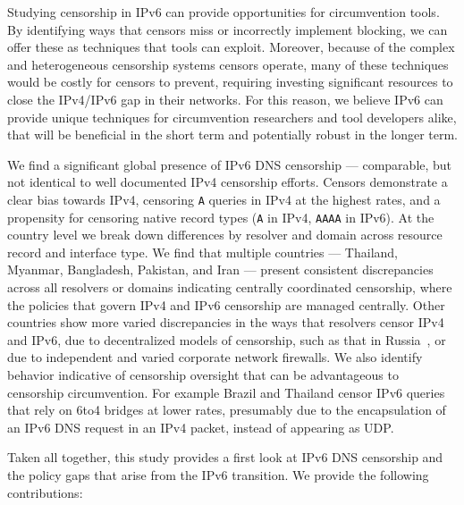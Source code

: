 Studying censorship in IPv6 can provide opportunities for circumvention tools.
By identifying ways that censors miss or incorrectly implement blocking, we can
offer these as techniques that tools can exploit. Moreover, because of the
complex and heterogeneous censorship systems censors operate, many of these
techniques would be costly for censors to prevent, requiring investing
significant resources to close the IPv4/IPv6 gap in their networks. For this
reason, we believe IPv6 can provide unique techniques for circumvention
researchers and tool developers alike, that will be beneficial in the short term
and potentially robust in the longer term.

\medskip
We find a significant global presence of IPv6 DNS censorship --- comparable, but
not identical to well documented IPv4 censorship efforts. Censors demonstrate a
clear bias towards IPv4, censoring \texttt{A} queries in IPv4 at the highest
rates, and a propensity for censoring native record types (\texttt{A} in IPv4,
\texttt{AAAA} in IPv6). At the country level we break down differences by
resolver and domain across resource record and interface type. We find that
multiple countries --- Thailand, Myanmar, Bangladesh, Pakistan, and Iran ---
present consistent discrepancies across all resolvers or domains indicating
centrally coordinated censorship, where the policies that govern IPv4 and IPv6
censorship are managed centrally. Other countries show more varied discrepancies
in the ways that resolvers censor IPv4 and IPv6, due to decentralized models of
censorship, such as that in Russia~\cite{ramesh2020decentralized}, or due to
independent and varied corporate network firewalls.
%
We also identify behavior indicative of censorship oversight that can be
advantageous to censorship circumvention. For example Brazil and Thailand censor
IPv6 queries that rely on 6to4 bridges at lower rates, presumably due to the
encapsulation of an IPv6 DNS request in an IPv4 packet, instead of appearing as
UDP.

Taken all together, this study provides a first look at IPv6 DNS censorship and
the policy gaps that arise from the IPv6 transition. We provide the following
contributions:

